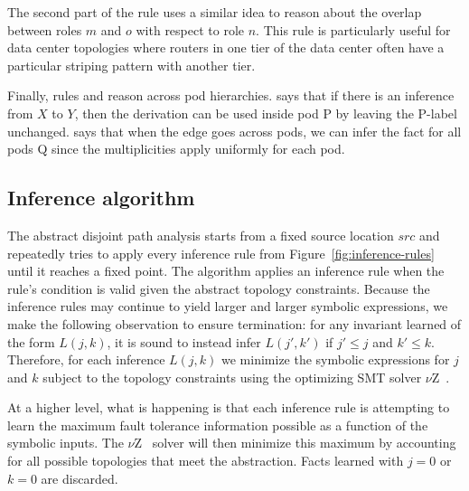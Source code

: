\documentclass[numbers, 10pt]{sigplanconf}
\newcommand{\IE}{\emph{i.e.}}
\begin{document}
The second part of the rule uses a similar idea to reason about the overlap between roles $m$ and $o$ with respect to role $n$. This rule is particularly useful for data center topologies where routers in one tier of the data center often have a particular striping pattern with another tier.

Finally, rules  and  reason across pod hierarchies.  says that if there is an inference from $X$ to $Y$, then the derivation can be used inside pod P by leaving the P-label unchanged.  says that when the edge goes across pods, we can infer the fact for all pods Q since the multiplicities apply uniformly for each pod.


\subsection{Inference algorithm}


The abstract disjoint path analysis starts from a fixed source location $src$ and repeatedly tries to apply every inference rule from Figure~\ref{fig:inference-rules} until it reaches a fixed point. The algorithm applies an inference rule when the rule's condition is valid given the abstract topology constraints. Because the inference rules may continue to yield larger and larger symbolic expressions, we make the following observation to ensure termination: for any invariant learned of the form $L(j,k)$, it is sound to instead infer $L(j',k')$ if $j' \leq j$ and $k' \leq k$. Therefore, for each inference $L(j,k)$ we minimize the symbolic expressions for $j$ and $k$ subject to the topology constraints using the optimizing SMT solver $\nu$Z~\cite{z3opt}. 

At a higher level, what is happening is that each inference rule is attempting to learn the maximum fault tolerance information possible as a function of the symbolic inputs. The $\nu$Z~\cite{z3opt} solver will then minimize this maximum by accounting for all possible topologies that meet the abstraction. Facts learned with $j=0$ or $k=0$ are discarded.

%
%
%
\end{document}
